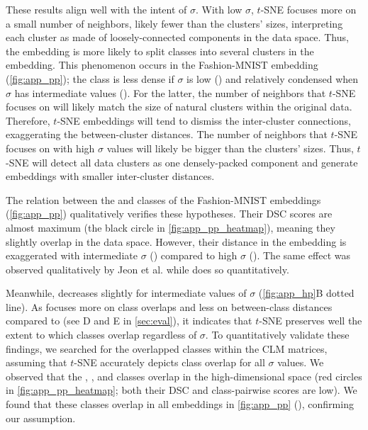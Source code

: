 These results align well with the intent of $\sigma$. With low $\sigma$, $t$-SNE focuses more on a small number of neighbors, likely fewer than the clusters' sizes, interpreting each cluster as made of loosely-connected components in the data space. Thus, the embedding is more likely to split classes into several clusters in the embedding.
This phenomenon occurs in the Fashion-MNIST embedding (\autoref{fig:app_pp}); the  class is less dense if $\sigma$ is low () and relatively condensed when $\sigma$ has intermediate values ().
For the latter, the number of neighbors that $t$-SNE focuses on will likely match the size of natural clusters within the original data. Therefore, $t$-SNE embeddings will tend to dismiss the inter-cluster connections, exaggerating the between-cluster distances. The number of neighbors that $t$-SNE focuses on with high $\sigma$ values will likely be bigger than the clusters' sizes. Thus, $t$-SNE will detect all data clusters as one densely-packed component and generate embeddings with smaller inter-cluster distances.

The relation between the  and  classes of the Fashion-MNIST embeddings (\autoref{fig:app_pp}) qualitatively verifies these hypotheses. Their DSC scores are almost maximum (the black circle in \autoref{fig:app_pp_heatmap}), meaning they slightly overlap in the data space. However, their distance in the embedding is exaggerated with intermediate $\sigma$ () compared to high $\sigma$ ().
The same effect was observed qualitatively by Jeon et al. \cite{jeon21tvcg} while \ltc does so quantitatively. 


Meanwhile, \lc [DSC] decreases slightly for intermediate values of $\sigma$ (\autoref{fig:app_hp}B dotted line). 
As \ltc [DSC] focuses more on class overlaps and less on between-class distances compared to \ltc [\CHb{}] (see D and E in \autoref{sec:eval}), it indicates that $t$-SNE preserves well the extent to which classes overlap regardless of $\sigma$.
To quantitatively validate these findings, we searched for the overlapped classes within the CLM matrices, assuming that $t$-SNE accurately depicts class overlap for all $\sigma$ values. We observed that the , , and  classes overlap in the high-dimensional space (red circles in \autoref{fig:app_pp_heatmap}; both their DSC and \CHb class-pairwise scores are low). 
We found that these classes overlap in all embeddings in \autoref{fig:app_pp} (), confirming our assumption. 


